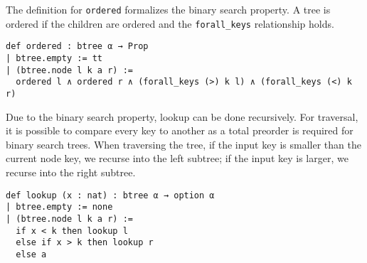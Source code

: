 The definition for \lstinline{ordered} formalizes the binary search property. A tree is ordered if the children are ordered and the \lstinline{forall_keys} relationship holds.

\begin{lstlisting}
def ordered : btree α → Prop
| btree.empty := tt
| (btree.node l k a r) :=
  ordered l ∧ ordered r ∧ (forall_keys (>) k l) ∧ (forall_keys (<) k r)
\end{lstlisting}

Due to the binary search property, lookup can be done recursively. For traversal, it is possible to compare every key to another as a total preorder is required for binary search trees. When traversing the tree, if the input key is smaller than the current node key, we recurse into the left subtree; if the input key is larger, we recurse into the right subtree.  

\begin{lstlisting}
def lookup (x : nat) : btree α → option α
| btree.empty := none
| (btree.node l k a r) :=
  if x < k then lookup l
  else if x > k then lookup r
  else a
\end{lstlisting}